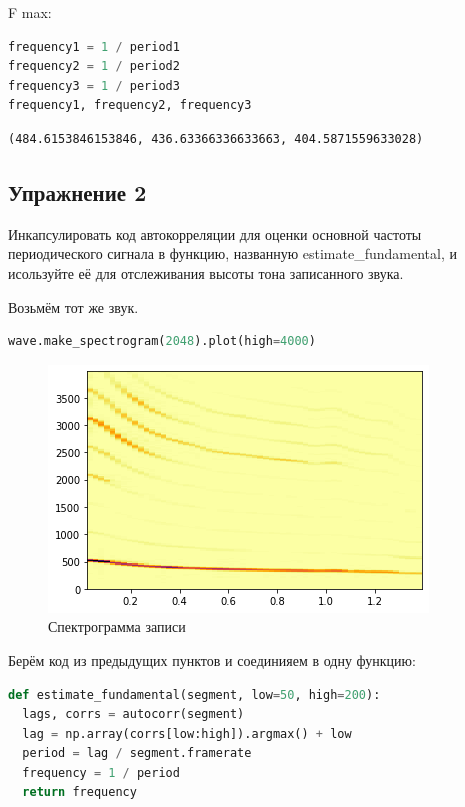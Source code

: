 F max:

\begin{lstlisting}[language=Python]
frequency1 = 1 / period1
frequency2 = 1 / period2
frequency3 = 1 / period3
frequency1, frequency2, frequency3
\end{lstlisting}
\begin{lstlisting}
(484.6153846153846, 436.63366336633663, 404.5871559633028)
\end{lstlisting}

\subsection{Упражнение 2}
Инкапсулировать код автокорреляции для оценки основной частоты периодического сигнала в функцию, названную estimate\_fundamental, и исользуйте её для отслеживания высоты тона записанного звука.

Возьмём тот же звук.

\begin{lstlisting}[language=Python]
wave.make_spectrogram(2048).plot(high=4000)
\end{lstlisting}
\begin{figure}[H]
	\begin{center}
		\includegraphics[scale=1]{fig/lab05/lab05_16_0.png}
		\caption{Спектрограмма записи}
	\end{center}
\end{figure}

Берём код из предыдущих пунктов и соединияем в одну функцию:

\begin{lstlisting}[language=Python]
def estimate_fundamental(segment, low=50, high=200):
  lags, corrs = autocorr(segment)
  lag = np.array(corrs[low:high]).argmax() + low
  period = lag / segment.framerate
  frequency = 1 / period
  return frequency
\end{lstlisting}

